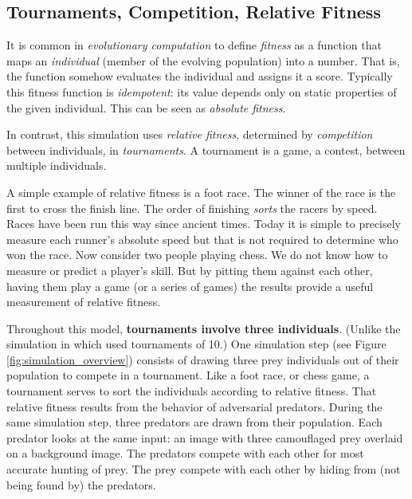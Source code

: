 \documentclass[letterpaper]{article}
\newcommand{\jargon}[1]{\textit{#1}}
\begin{document}
\subsection{Tournaments, Competition, Relative Fitness}
\label{subsec:tournaments}
It is common in \jargon{evolutionary computation} to define \jargon{fitness} as a function that maps an \jargon{individual} (member of the evolving population) into a number. That is, the function somehow evaluates the individual and assigns it a score. Typically this fitness function is \jargon{idempotent}: its value depends only on static properties of the given individual. This can be seen as \jargon{absolute fitness}.
\par
In contrast, this simulation uses \jargon{relative fitness}, determined by \jargon{competition} between individuals, in \jargon{tournaments}. A tournament is a game, a contest, between multiple individuals. 
\par
A simple example of relative fitness is a foot race. The winner of the race is the first to cross the finish line. The order of finishing \jargon{sorts} the racers by speed. Races have been run this way since ancient times. Today it is simple to precisely measure each runner's absolute speed but that is not required to determine who won the race. Now consider two people playing chess. We do not know how to measure or predict a player's skill. But by pitting them against each other, having them play a game (or a series of games) the results provide a useful measurement of relative fitness. 
\par
Throughout this model, \textbf{tournaments involve three individuals}. (Unlike the simulation in \citet{reynolds_iec_2011} which used tournaments of 10.) One simulation step (see Figure \ref{fig:simulation_overview}) consists of drawing three prey individuals out of their population to compete in a tournament. Like a foot race, or chess game, a tournament serves to sort the individuals according to relative fitness. That relative fitness results from the behavior of adversarial predators. During the same simulation step, three predators are drawn from their population. Each predator looks at the same input: an image with three camouflaged prey overlaid on a background image. The predators compete with each other for most accurate hunting of prey. The prey compete with each other by hiding from (not being found by) the predators.
\par

\end{document}
